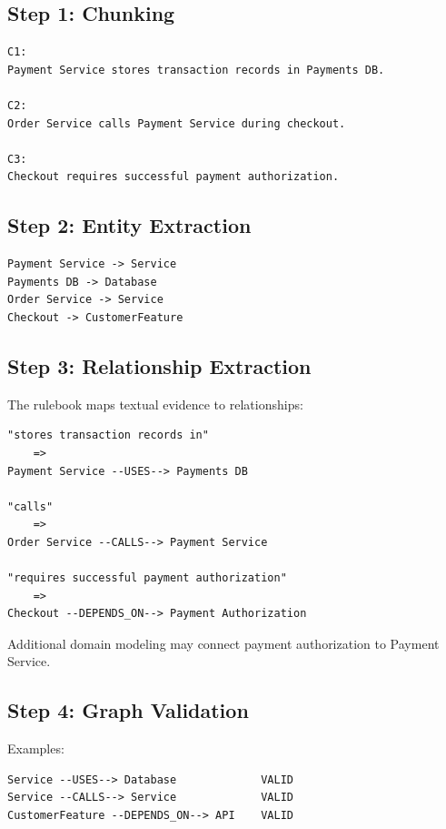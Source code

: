\documentclass[11pt,a4paper]{article}
\begin{document}
\subsection{Step 1: Chunking}

\begin{lstlisting}
C1:
Payment Service stores transaction records in Payments DB.

C2:
Order Service calls Payment Service during checkout.

C3:
Checkout requires successful payment authorization.
\end{lstlisting}

\subsection{Step 2: Entity Extraction}

\begin{lstlisting}
Payment Service -> Service
Payments DB -> Database
Order Service -> Service
Checkout -> CustomerFeature
\end{lstlisting}

\subsection{Step 3: Relationship Extraction}

The rulebook maps textual evidence to relationships:

\begin{lstlisting}
"stores transaction records in"
    =>
Payment Service --USES--> Payments DB

"calls"
    =>
Order Service --CALLS--> Payment Service

"requires successful payment authorization"
    =>
Checkout --DEPENDS_ON--> Payment Authorization
\end{lstlisting}

Additional domain modeling may connect payment authorization to Payment Service.

\subsection{Step 4: Graph Validation}

Examples:

\begin{lstlisting}
Service --USES--> Database             VALID
Service --CALLS--> Service             VALID
CustomerFeature --DEPENDS_ON--> API    VALID
\end{lstlisting}
\end{document}

